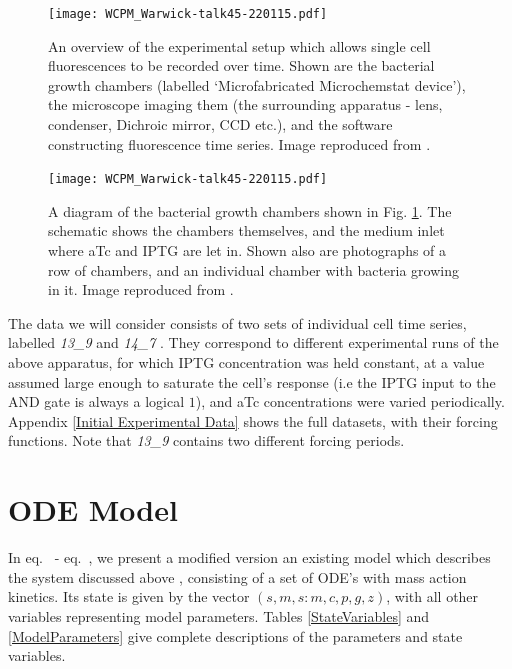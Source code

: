 \documentclass[10pt,journal]{./IEEE_latex_class/IEEEtran}
\renewcommand{\eqref}{eq.~\originaleqref}
\begin{document}
\begin{figure}
    \centering
		\texttt{[image: WCPM\_Warwick-talk45-220115.pdf]}
        \caption{An overview of the experimental setup which allows single cell fluorescences to be recorded over time. Shown are the bacterial growth chambers (labelled `Microfabricated Microchemstat device'), the microscope imaging them (the surrounding apparatus - lens, condenser, Dichroic mirror, CCD etc.), and the software constructing fluorescence time series. Image reproduced from \cite{Jaramillo}. }
            \label{ExperimentalSetup_overview}
            \vspace{-5mm}
\end{figure}
\begin{figure}
    \centering
	\texttt{[image: WCPM\_Warwick-talk45-220115.pdf]}
        \caption{A diagram of the bacterial growth chambers shown in Fig. \ref{ExperimentalSetup_overview}. The schematic shows the chambers themselves, and the medium inlet where aTc and IPTG are let in. Shown also are photographs of a row of chambers, and an individual chamber with bacteria growing in it. Image reproduced from \cite{Jaramillo}.}
    \label{ExperimentalSetup_chambers}
    \vspace{-5mm}
\end{figure}

The data we will consider consists of two sets of individual cell time series, labelled \textit{13\_9} and \textit{14\_7} \cite{Jaramilloa}. They correspond to different experimental runs of the above apparatus, for which IPTG concentration was held constant, at a value assumed large enough to saturate the cell's response (i.e the IPTG input to the AND gate is always a logical $1$), and aTc concentrations were varied periodically. Appendix \ref{Initial  Experimental Data} shows the full datasets, with their forcing functions. Note that \textit{13\_9} contains two different forcing periods.




\section{ODE Model}
\label{ODEModel}

In \eqref{eq:s} - \eqref{eq:z}, we present a modified version an existing model which describes the system discussed above \cite{Jaramilloa}, consisting of a set of ODE's with mass action kinetics.  Its state is given by the vector $(s,m,s:m,c,p,g,z)$, with all other variables representing model parameters. Tables \ref{StateVariables} and \ref{ModelParameters} give complete descriptions of the parameters and state variables.
 
\end{document}
